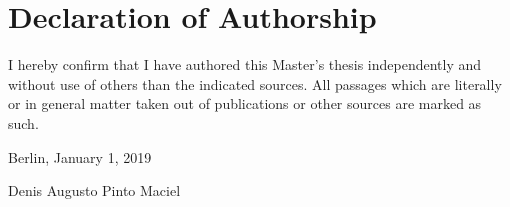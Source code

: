 
\section*{Declaration of Authorship}

I hereby confirm that I have authored this Master's
thesis independently and without use of others than the indicated
sources. All passages which are literally or in general matter
taken out of publications or other sources are marked as such.
\vspace{1cm}

Berlin, January 1, 2019 \vspace{0.5cm}

Denis Augusto Pinto Maciel
